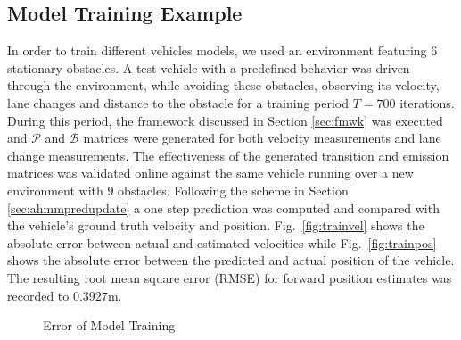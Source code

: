\documentclass[letterpaper, 10 pt, conference]{ieeeconf}  %
\begin{document}
\subsection{Model Training Example}
In order to train different vehicles models, we used an environment featuring $6$ stationary obstacles. A test vehicle with a predefined behavior was driven through the environment, while avoiding these obstacles, observing its velocity, lane changes and distance to the obstacle for a training period $T=700$ iterations. During this period, the framework discussed in Section \ref{sec:fmwk} was executed and $\mathcal P$ and $\mathcal B$ matrices were generated for both velocity measurements and lane change measurements. The effectiveness of the generated transition and emission matrices was validated online against the same vehicle running over a new environment with $9$ obstacles. Following the scheme in Section \ref{sec:ahmmpredupdate} a one step prediction was computed and compared with the vehicle's ground truth velocity and position.
Fig.~\ref{fig:trainvel} shows the absolute error between actual and estimated velocities while Fig.~\ref{fig:trainpos} shows the absolute error between the predicted and actual position of the vehicle. The resulting root mean square error (RMSE) for forward position estimates was recorded to $0.3927$m.

\begin{figure}[H]
	\centering
	\vspace{-5pt}
	\caption{Error of Model Training}
	\label{fig:trainerrors}
	\vspace{-5pt}
\end{figure}
\end{document}
